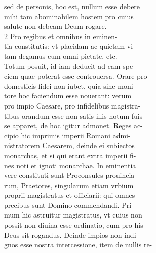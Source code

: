 \documentclass{article}
\begin{document}
\begin{pages}
                sed de personis, hoc est, nullum esse debere \\
                mihi tam abominabilem hostem pro cuius \\
                salute non debeam Deum rogare. \\
                2 Pro regibus et omnibus in eminen- \\
                tia constitutis: vt placidam ac quietam vi- \\
                tam degamus cum omni pietate, etc. \\
                Totum posuit, id iam deducit ad eam spe- \\
                ciem quae poterat esse controuersa. Orare pro \\
                domesticis fidei non iubet, quia sine moni- \\
                tore hoc faciendum esse nouerant: verum \\
                pro impio Caesare, pro infidelibus magistra- \\
                tibus orandum esse non satis illis notum fuis- \\
                se apparet, de hoc igitur admonet. Reges ac- \\
                cipio hic imprimis imperii Romani admi- \\
                nistratorem Caesarem, deinde ei subiectos \\
                monarchas, et si qui erant extra imperii fi- \\
                nes noti et ignoti monarchae. In eminentia \\
                vere constituti sunt Proconsules prouincia- \\
                rum, Praetores, singularum etiam vrbium \\
                proprii magistratus et officiarii: qui omnes \\
                precibus sunt Domino commendandi. Pri- \\
                mum hic astruitur magistratus, vt cuius non \\
                possit non diuina esse ordinatio, cum pro his \\
                Deus sit rogandus. Deinde impios non indi- \\
                gnos esse nostra intercessione, item de nullis re- \\

\end{pages}
\end{document}

